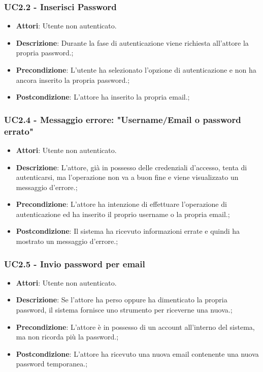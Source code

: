 \subsubsection{UC2.2 - Inserisci Password} 
\label{sssec:UC2.2} 
\begin{itemize} 
\item \textbf{Attori}: Utente non autenticato.
\item \textbf{Descrizione}: Durante la fase di autenticazione viene richiesta all'attore la propria password.;
\item \textbf{Precondizione}: L'utente ha selezionato l'opzione di autenticazione e non ha ancora inserito la propria password.;
\item \textbf{Postcondizione}: L'attore ha inserito la propria email.;
\end{itemize} 
\subsubsection{UC2.4 - Messaggio errore: "Username/Email o password errato"} 
\label{sssec:UC2.4} 
\begin{itemize} 
\item \textbf{Attori}: Utente non autenticato.
\item \textbf{Descrizione}: L'attore, già in possesso delle credenziali d'accesso, tenta di autenticarsi, ma l'operazione non va a buon fine e viene visualizzato un messaggio d'errore.;
\item \textbf{Precondizione}: L'attore ha intenzione di effettuare l'operazione di autenticazione ed ha inserito il proprio username o la propria email.;
\item \textbf{Postcondizione}: Il sistema ha ricevuto informazioni errate e quindi ha mostrato un messaggio d'errore.;
\end{itemize} 
\subsubsection{UC2.5 - Invio password per email} 
\label{sssec:UC2.5} 
\begin{itemize} 
\item \textbf{Attori}: Utente non autenticato.
\item \textbf{Descrizione}: Se l'attore ha perso oppure ha dimenticato la propria password, il sistema fornisce uno strumento per riceverne una nuova.;
\item \textbf{Precondizione}: L'attore è in possesso di un account all'interno del sistema, ma non ricorda più la password.;
\item \textbf{Postcondizione}: L'attore ha ricevuto una nuova email contenente una nuova password temporanea.;
\end{itemize} 
